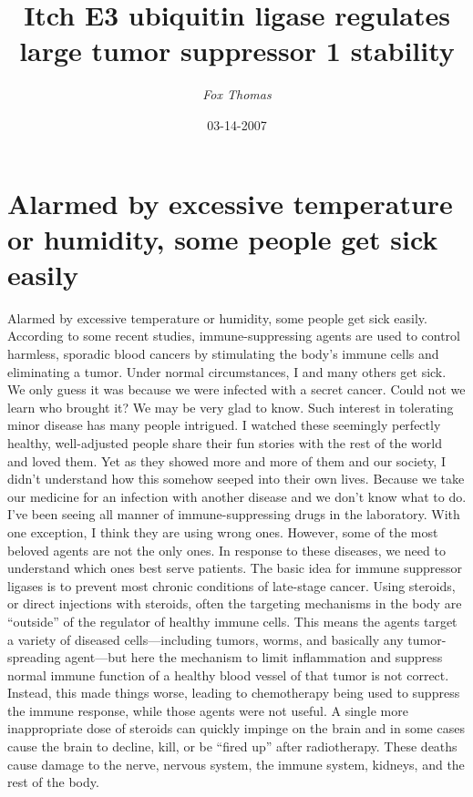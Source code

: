 \documentclass{article}%
\title{Itch E3 ubiquitin ligase regulates large tumor suppressor 1 stability}%
\author{\textit{Fox Thomas}}%
\date{03-14-2007}%
\begin{document}
%
\normalsize%
\maketitle%
\section{Alarmed by excessive temperature or humidity, some people get sick easily}%
\label{sec:Alarmedbyexcessivetemperatureorhumidity,somepeoplegetsickeasily}%
Alarmed by excessive temperature or humidity, some people get sick easily. According to some recent studies, immune{-}suppressing agents are used to control harmless, sporadic blood cancers by stimulating the body’s immune cells and eliminating a tumor. Under normal circumstances, I and many others get sick. We only guess it was because we were infected with a secret cancer. Could not we learn who brought it? We may be very glad to know.\newline%
Such interest in tolerating minor disease has many people intrigued. I watched these seemingly perfectly healthy, well{-}adjusted people share their fun stories with the rest of the world and loved them. Yet as they showed more and more of them and our society, I didn’t understand how this somehow seeped into their own lives. Because we take our medicine for an infection with another disease and we don’t know what to do.\newline%
I’ve been seeing all manner of immune{-}suppressing drugs in the laboratory. With one exception, I think they are using wrong ones.\newline%
However, some of the most beloved agents are not the only ones. In response to these diseases, we need to understand which ones best serve patients.\newline%
The basic idea for immune suppressor ligases is to prevent most chronic conditions of late{-}stage cancer. Using steroids, or direct injections with steroids, often the targeting mechanisms in the body are “outside” of the regulator of healthy immune cells. This means the agents target a variety of diseased cells—including tumors, worms, and basically any tumor{-}spreading agent—but here the mechanism to limit inflammation and suppress normal immune function of a healthy blood vessel of that tumor is not correct. Instead, this made things worse, leading to chemotherapy being used to suppress the immune response, while those agents were not useful.\newline%
A single more inappropriate dose of steroids can quickly impinge on the brain and in some cases cause the brain to decline, kill, or be “fired up” after radiotherapy. These deaths cause damage to the nerve, nervous system, the immune system, kidneys, and the rest of the body.\newline%
\end{document}
